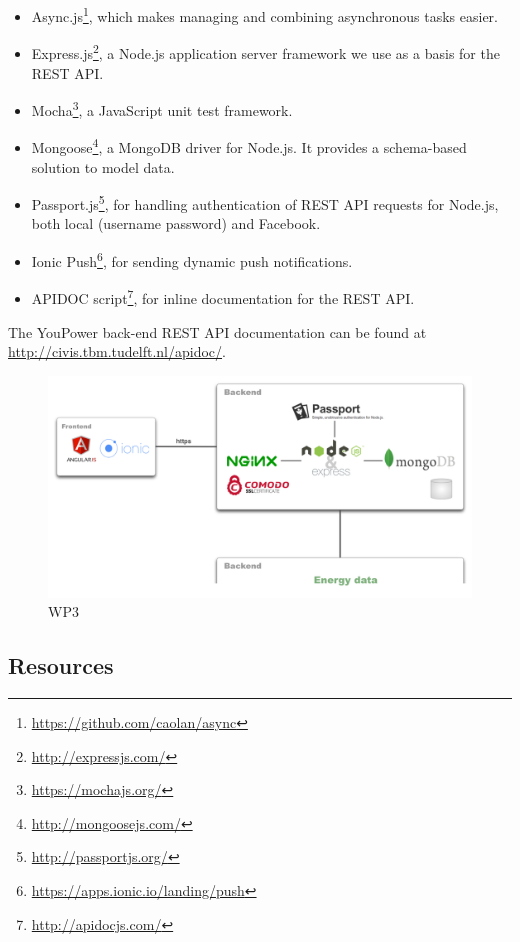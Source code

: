 \begin{itemize}
\item Async.js\footnote{\url{https://github.com/caolan/async}}, which makes managing and combining asynchronous tasks easier. 
\item Express.js\footnote{\url{http://expressjs.com/}}, a Node.js application server framework we use as a basis for the REST API. 
\item Mocha\footnote{\url{https://mochajs.org/}}, a JavaScript unit test framework. 
\item Mongoose\footnote{\url{http://mongoosejs.com/}}, a MongoDB driver for Node.js. It provides a schema-based solution to model data. 
\item Passport.js\footnote{\url{http://passportjs.org/}}, for handling authentication of REST API requests for Node.js, both local (username password) and Facebook. 
\item Ionic Push\footnote{\url{https://apps.ionic.io/landing/push}}, for sending dynamic push notifications. 
\item APIDOC script\footnote{\url{http://apidocjs.com/}}, for inline documentation for the REST API. 
\end{itemize}

The YouPower back-end REST API documentation can be found at {\footnotesize\url{http://civis.tbm.tudelft.nl/apidoc/}}. 
% 


\begin{figure}
\centering
\includegraphics[width=0.9\linewidth]{img/tech}
\caption{WP3}
\label{fig:ScreenShot2015-11-09at18}
\end{figure}


\subsection{Resources}